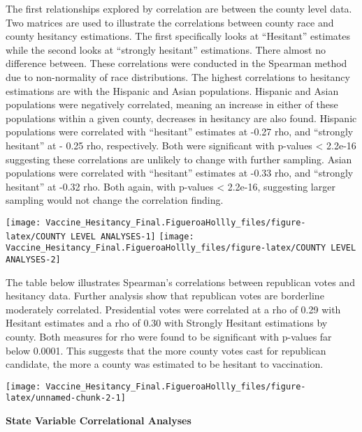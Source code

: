 \documentclass[
]{article}
\begin{document}
The first relationships explored by correlation are between the county
level data. Two matrices are used to illustrate the correlations between
county race and county hesitancy estimations. The first specifically
looks at ``Hesitant'' estimates while the second looks at ``strongly
hesitant'' estimations. There almost no difference between. These
correlations were conducted in the Spearman method due to non-normality
of race distributions. The highest correlations to hesitancy estimations
are with the Hispanic and Asian populations. Hispanic and Asian
populations were negatively correlated, meaning an increase in either of
these populations within a given county, decreases in hesitancy are also
found. Hispanic populations were correlated with ``hesitant'' estimates
at -0.27 rho, and ``strongly hesitant'' at - 0.25 rho, respectively.
Both were significant with p-values \textless{} 2.2e-16 suggesting these
correlations are unlikely to change with further sampling. Asian
populations were correlated with ``hesitant'' estimates at -0.33 rho,
and ``strongly hesitant'' at -0.32 rho. Both again, with p-values
\textless{} 2.2e-16, suggesting larger sampling would not change the
correlation finding.

\texttt{[image: Vaccine\_Hesitancy\_Final.FigueroaHollly\_files/figure-latex/COUNTY LEVEL ANALYSES-1]}
\texttt{[image: Vaccine\_Hesitancy\_Final.FigueroaHollly\_files/figure-latex/COUNTY LEVEL ANALYSES-2]}

The table below illustrates Spearman's correlations between republican
votes and hesitancy data. Further analysis show that republican votes
are borderline moderately correlated. Presidential votes were correlated
at a rho of 0.29 with Hesitant estimates and a rho of 0.30 with Strongly
Hesitant estimations by county. Both measures for rho were found to be
significant with p-values far below 0.0001. This suggests that the more
county votes cast for republican candidate, the more a county was
estimated to be hesitant to vaccination.

\texttt{[image: Vaccine\_Hesitancy\_Final.FigueroaHollly\_files/figure-latex/unnamed-chunk-2-1]}

\textbf{State Variable Correlational Analyses}
\end{document}

